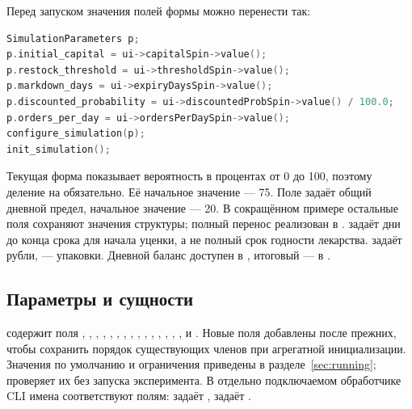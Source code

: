Перед запуском значения полей формы можно перенести так:
\begin{lstlisting}[language=C++]
SimulationParameters p;
p.initial_capital = ui->capitalSpin->value();
p.restock_threshold = ui->thresholdSpin->value();
p.markdown_days = ui->expiryDaysSpin->value();
p.discounted_probability = ui->discountedProbSpin->value() / 100.0;
p.orders_per_day = ui->ordersPerDaySpin->value();
configure_simulation(p);
init_simulation();
\end{lstlisting}
Текущая форма показывает вероятность в процентах от 0 до 100,
поэтому деление на  обязательно. Её начальное значение --- 75.
Поле  задаёт общий дневной предел, начальное значение --- 20.
В сокращённом примере остальные поля сохраняют значения структуры;
полный перенос реализован в .  задаёт
дни до конца срока для начала уценки, а не полный срок годности лекарства.
 задаёт рубли,  --- упаковки.
Дневной баланс доступен в ,
итоговый --- в .

\subsection{Параметры и сущности}
 содержит поля , ,
, , ,
, ,
, , ,
, , ,
, , 
и . Новые поля добавлены после прежних, чтобы
сохранить порядок существующих членов при агрегатной инициализации.
Значения по умолчанию и ограничения
приведены в разделе~\ref{sec:running};  проверяет их
без запуска эксперимента. В отдельно подключаемом обработчике CLI имена соответствуют полям:
 задаёт ,
 задаёт .

